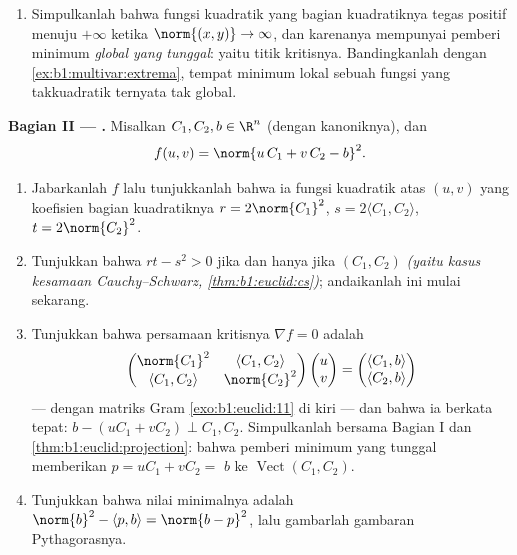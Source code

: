 \begin{problem}
\begin{enumerate}
\[        \qquad
        c = \frac{rt - s^2}{r + t} > 0 .
        \]
        \emph{(Tunjukkanlah bahwa bentuk kuadratik $q - c(h^2 + k^2)$,
        yang berkoefisien $r - c$, $s$, $t - c$, masih mempunyai
        data uji diskriminan yang taknegatif.)}
  \item Simpulkanlah bahwa fungsi kuadratik yang bagian kuadratiknya tegas
        positif menuju $+\infty$ ketika $\norm{(x,y)} \to
        \infty$, dan karenanya mempunyai pemberi minimum \emph{global
        yang tunggal}: yaitu titik kritisnya. Bandingkanlah dengan
        \cref{ex:b1:multivar:extrema}, tempat minimum lokal sebuah
        fungsi yang takkuadratik ternyata tak global.
\end{enumerate}

\medskip
\noindent\textbf{Bagian II --- .} Misalkan $C_1,
C_2, b \in \R^n$ (dengan  kanoniknya), dan
\[
f(u, v) = \norm{u\,C_1 + v\,C_2 - b}^2 .
\]
\begin{enumerate}[resume]
  \item Jabarkanlah $f$ lalu tunjukkanlah bahwa ia fungsi kuadratik atas $(u,
        v)$ yang koefisien bagian kuadratiknya $r = 2\norm{C_1}^2$,
        $s = 2\langle C_1, C_2\rangle$, $t = 2\norm{C_2}^2$.
  \item Tunjukkan bahwa $rt - s^2 > 0$ jika dan hanya jika $(C_1, C_2)$
         \emph{(yaitu kasus kesamaan Cauchy--Schwarz,
        \cref{thm:b1:euclid:cs})}; andaikanlah ini mulai sekarang.
  \item Tunjukkan bahwa persamaan kritisnya $\nabla f = 0$ adalah
        \emph{}
        \[
        \begin{pmatrix}
        \norm{C_1}^2 & \langle C_1, C_2\rangle\\
        \langle C_1, C_2\rangle & \norm{C_2}^2
        \end{pmatrix}
        \begin{pmatrix} u\\ v\end{pmatrix}
        =
        \begin{pmatrix} \langle C_1, b\rangle\\ \langle C_2,
        b\rangle\end{pmatrix}
        \]
        --- dengan matriks Gram \cref{exo:b1:euclid:11} di
        kiri --- dan bahwa ia berkata tepat: $b - (uC_1 + vC_2)
        \perp C_1, C_2$. Simpulkanlah bersama Bagian I dan
        \cref{thm:b1:euclid:projection}: bahwa pemberi minimum yang tunggal
        memberikan $p = uC_1 + vC_2 =$ 
        $b$ ke $\operatorname{Vect}(C_1, C_2)$.
  \item Tunjukkan bahwa nilai minimalnya adalah $\norm{b}^2 - \langle p,
        b\rangle = \norm{b - p}^2$, lalu gambarlah
        gambaran Pythagorasnya.
\end{enumerate}


\end{problem}
